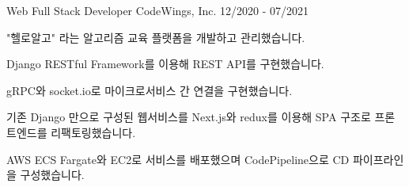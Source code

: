 \cventry
{Web Full Stack Developer} %
{CodeWings, Inc.} %
{} %
{12/2020 - 07/2021} %
\begin{cvitems}
\item {"헬로알고" 라는 알고리즘 교육 플랫폼을 개발하고 관리했습니다.}
\item {Django RESTful Framework를 이용해 REST API를 구현했습니다.}
\item {gRPC와 socket.io로 마이크로서비스 간 연결을 구현했습니다.}
\item {기존 Django 만으로 구성된 웹서비스를 Next.js와 redux를 이용해 SPA 구조로 프론트엔드를 리팩토링했습니다.}
\item {AWS ECS Fargate와 EC2로 서비스를 배포했으며 CodePipeline으로 CD 파이프라인을 구성했습니다.}
\end{cvitems}
